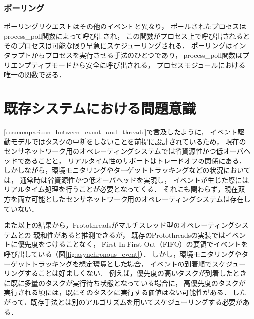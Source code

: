 \subsubsection{ポーリング}

\vspace{0.5em}ポーリングリクエストはその他のイベントと異なり，
ポールされたプロセスはprocess\_poll関数によって呼び出され，
この関数がプロセス上で呼び出されるとそのプロセスは可能な限り早急にスケジューリングされる．
ポーリングはインタラプトからプロセスを実行させる手法のひとつであり，
process\_poll関数はプリエンプティブモードから安全に呼び出される，
プロセスモジュールにおける唯一の関数である．







\section{既存システムにおける問題意識}\label{sec:problems}
\ref{sec:comparison_between_event_and_threads}で言及したように，
イベント駆動モデルではタスクの中断をしないことを前提に設計されているため，
現在のセンサネットワーク用のオペレーティングシステムでは省資源性かつ低オーバヘッドであることと，
リアルタイム性のサポートはトレードオフの関係にある．
しかしながら，環境モニタリングやターゲットトラッキングなどの状況においては，
通常時は省資源性かつ低オーバヘッドを実現し，
イベントが生じた際にはリアルタイム処理を行うことが必要となってくる．
それにも関わらず，現在双方を両立可能としたセンサネットワーク用のオペレーティングシステムは存在していない．

また以上の結果から，Protothreadsがマルチスレッド型のオペレーティングシステムとの
親和性があると推測できるが，
既存のProtothreadsの実装ではイベントに優先度をつけることなく，
First In First Out（FIFO）の要領でイベントを呼び出している（図\ref{fig:asynchronous_event}）．
しかし，環境モニタリングやターゲットトラッキングを想定環境とした場合，
イベントの到着順でスケジューリングすることは好ましくない．
例えば，優先度の高いタスクが到着したときに既に多量のタスクが実行待ち状態となっている場合に，
高優先度のタスクが実行される頃には，既にそのタスクに実行する価値はない可能性がある．
したがって，既存手法とは別のアルゴリズムを用いてスケジューリングする必要がある．


